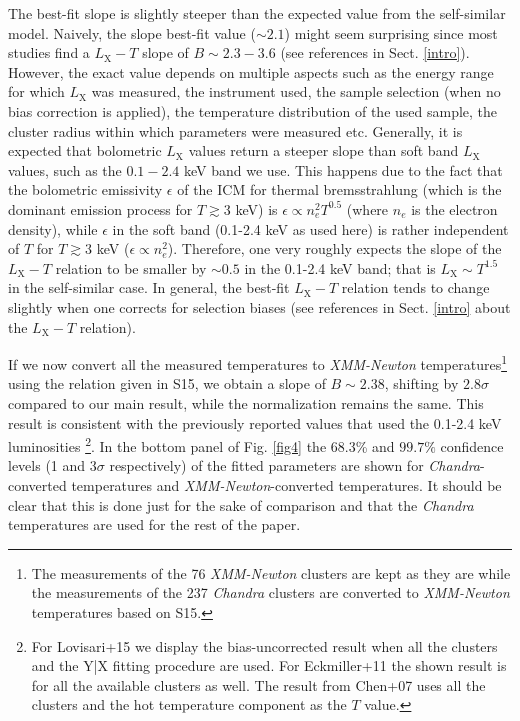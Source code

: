 \documentclass{aa}   %
\begin{document}
The best-fit slope is slightly steeper than the expected value from the self-similar model. Naively, the slope best-fit value ($\sim 2.1$) might seem surprising since most studies find a $L_{\text{X}}-T$ slope of $B\sim 2.3-3.6$ (see references in Sect. \ref{intro}). However, the exact value depends on multiple aspects such as the energy range for which $L_{\text{X}}$ was measured, the instrument used, the sample selection (when no bias correction is applied), the temperature distribution of the used sample, the cluster radius within which parameters were measured etc. Generally, it is expected that bolometric $L_{\text{X}}$ values return a steeper slope than soft band $L_{\text{X}}$ values, such as the $0.1-2.4$ keV band we use. This happens due to the fact that the bolometric emissivity $\epsilon$ of the ICM for thermal bremsstrahlung (which is the dominant emission process for $T\gtrsim 3$ keV) is $\epsilon \propto n_e^2 T^{0.5}$ (where $n_e$ is the electron density), while $\epsilon$ in the soft band (0.1-2.4 keV as used here) is rather independent of $T$ for $T\gtrsim 3$ keV ($\epsilon \propto n_e^2$). Therefore, one very roughly expects the slope of the $L_{\text{X}}-T$ relation to be smaller by $\sim 0.5$ in the 0.1-2.4 keV band; that is $L_{\text{X}}\sim T^{1.5}$ in the self-similar case. In general, the best-fit $L_{\text{X}}-T$ relation tends to change slightly when one corrects for selection biases (see references in Sect. \ref{intro} about the $L_{\text{X}}-T$ relation).


If we now convert all the measured temperatures to \textit{XMM-Newton} temperatures\footnote{The measurements of the 76 \textit{XMM-Newton} clusters are kept as they are while the measurements of the 237 \textit{Chandra} clusters are converted to \textit{XMM-Newton} temperatures based on S15.} using the relation given in S15, we obtain a slope of $B\sim 2.38$, shifting by $2.8\sigma$ compared to our main result, while the normalization remains the same. This result is consistent with the previously reported values that used the 0.1-2.4 keV luminosities \citep[e.g.,][]{chen,eckmiller,lovisari}\footnote{For Lovisari+15 we display the bias-uncorrected result when all the clusters and the Y|X fitting procedure are used. For Eckmiller+11 the shown result is for all the available clusters as well. The result from Chen+07 uses all the clusters and the hot temperature component as the $T$ value.}. In the bottom panel of Fig. \ref{fig4} the 68.3\% and $99.7\%$ confidence levels (1 and $3\sigma$ respectively) of the fitted parameters are shown for \textit{Chandra}-converted temperatures and \textit{XMM-Newton}-converted temperatures. It should be clear that this is done just for the sake of comparison and that the \textit{Chandra} temperatures are used for the rest of the paper.
\end{document}
